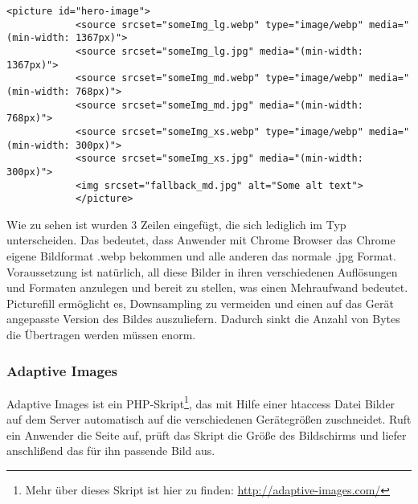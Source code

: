 			\begin{lstlisting}[captionpos=b, caption=Srcset mit webp, label=lst:srcsetWebp]
			<picture id="hero-image">
		    <source srcset="someImg_lg.webp" type="image/webp" media="(min-width: 1367px)">
		    <source srcset="someImg_lg.jpg" media="(min-width: 1367px)">
		    <source srcset="someImg_md.webp" type="image/webp" media="(min-width: 768px)">
		    <source srcset="someImg_md.jpg" media="(min-width: 768px)">
		    <source srcset="someImg_xs.webp" type="image/webp" media="(min-width: 300px)">
		    <source srcset="someImg_xs.jpg" media="(min-width: 300px)">
		    <img srcset="fallback_md.jpg" alt="Some alt text">
			</picture>
			\end{lstlisting}

			Wie zu sehen ist wurden 3 Zeilen eingefügt, die sich lediglich im Typ unterscheiden. Das bedeutet, dass Anwender mit Chrome Browser das Chrome eigene Bildformat .webp bekommen und alle anderen das normale .jpg Format. Voraussetzung ist natürlich, all diese Bilder in ihren verschiedenen Auflösungen und Formaten anzulegen und bereit zu stellen, was einen Mehraufwand bedeutet.
			Picturefill ermöglicht es, Downsampling zu vermeiden und einen auf das Gerät angepasste Version des Bildes auszuliefern. Dadurch sinkt die Anzahl von Bytes die Übertragen werden müssen enorm.


		\subsubsection{Adaptive Images} %
		\label{ssub:adaptive_images}
			Adaptive Images ist ein PHP-Skript\footnote{Mehr über dieses Skript ist hier zu finden: \url{http://adaptive-images.com/}}, das mit Hilfe einer htaccess Datei Bilder auf dem Server automatisch auf die verschiedenen Gerätegrößen zuschneidet. Ruft ein Anwender die Seite auf, prüft das Skript die Größe des Bildschirms und liefer anschlißend das für ihn passende Bild aus. 



